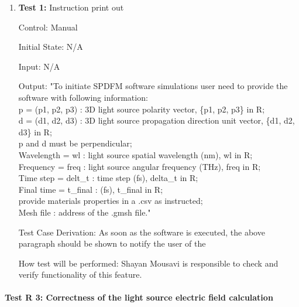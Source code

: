 \documentclass[12pt, titlepage]{article}
\begin{document}
\begin{enumerate}
	
	\item{\textbf{Test 1:} Instruction print out\\}
	
	Control: Manual
	
	Initial State: N/A
	
	Input: N/A
	
	Output: 
	"To initiate SPDFM software simulations user need to provide the software with following information:\\
	p = (p1, p2, p3) : 3D light source polarity vector, \{p1, p2, p3\} in R;\\
	d = (d1, d2, d3) : 3D light source propagation direction unit vector, \{d1, d2, d3\} in R;\\
	p and d must be perpendicular;\\ 
	Wavelength = wl : light source spatial wavelength (nm), wl in R;\\
	Frequency = freq : light source angular frequency (THz), freq in R;\\
	Time step = delt\_t : time step (fs), delta\_t in R;\\
	Final time = t\_final : (fs), t\_final in R;\\
	provide materials properties in a .csv as instructed;\\
	Mesh file : address of the .gmsh file."
	
	Test Case Derivation: As soon as the software is executed, the above paragraph should be shown to notify the user of the 
	
	How test will be performed: Shayan Mousavi is responsible to check and verify functionality of this feature.   
	
	
\end{enumerate}



\paragraph{Test R 3: Correctness of the light source electric field calculation}
\end{document}
